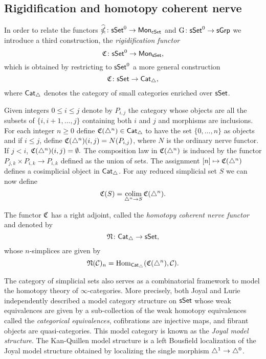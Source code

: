 \subsection{Rigidification and homotopy coherent nerve}

In order to relate the functors $\widehat{\operatorname{\mathbb{\Omega}}} \colon \mathsf{sSet}^0 \to \mathsf{Mon}_{\mathsf{cSet}}$ and $\operatorname{G} \colon \mathsf{sSet}^0\to \mathsf{sGrp}$ we introduce a third construction, the \textit{rigidification functor}
$$\operatorname{\mathfrak{C}} \colon \mathsf{sSet}^0 \to \mathsf{Mon}_{\mathsf{sSet}},$$
which is obtained by restricting to $\mathsf{sSet}^0$ a more general construction
$$\operatorname{\mathfrak{C}} \colon \mathsf{sSet} \to \mathsf{Cat}_{\triangle},$$
where $\mathsf{Cat}_{\triangle}$ denotes the category of small categories enriched over $\mathsf{sSet}$.

Given integers $0 \leq  i \leq j$ denote by $P_{i,j}$ the category whose objects are all the subsets of $\{i, i+1, \dots, j\}$ containing both $i$ and $j$ and morphisms are inclusions.
For each integer $n \geq 0$ define $\operatorname{\mathfrak{C}}(\triangle^n) \in \mathsf{Cat}_{\triangle}$ to have the set $\{0, \dots, n\}$ as objects and if $i \leq j$, define $\operatorname{\mathfrak{C}}(\triangle^n)(i,j)= N(P_{i,j})$, where $N$ is the ordinary nerve functor.
If $j < i$, $\operatorname{\mathfrak{C}}(\triangle^n)(i,j) = \emptyset.$ The composition law in $\operatorname{\mathfrak{C}}(\triangle^n)$ is induced by the functor $P_{j,k} \times P_{i,k} \to P_{i,k}$ defined as the union of sets.
The assignment $[n] \mapsto \operatorname{\mathfrak{C}}(\triangle^n)$ defines a cosimplicial object in $\mathsf{Cat}_{\triangle}$.
For any reduced simplicial set $S$ we can now define
\begin{equation*}
\operatorname{\mathfrak{C}}(S) = \operatorname*{colim}_{\triangle^n \to S} \operatorname{\mathfrak{C}}(\triangle^n).
\end{equation*}

The functor $\operatorname{\mathfrak{C}}$ has a right adjoint, called the \textit{homotopy coherent nerve functor} and denoted by
$$\operatorname{\mathfrak{N}} \colon \mathsf{Cat}_{\triangle} \to \mathsf{sSet},$$
whose $n$-simplices are given by 
$$\operatorname{\mathfrak{N}}(\mathcal{C})_n = \mathrm{Hom}_{\mathsf{Cat}_{\triangle}}(\operatorname{\mathfrak{C}}(\triangle^n), \mathcal{C}).$$

The category of simplicial sets also serves as a combinatorial framework to model the homotopy theory of $\infty$-categories.
More precisely, both Joyal and Lurie independently described a model category structure on $\mathsf{sSet}$ whose weak equivalences are given by a sub-collection of the weak homotopy equivalences called the \textit{categorical equivalences}, cofibrations are injective maps, and fibrant objects are quasi-categories.
This model category is known as the \textit{Joyal model structure}.
The Kan-Quillen model structure is a left Bousfield localization of the Joyal model structure obtained by localizing the single morphism $\triangle^1 \to \triangle^0$.

